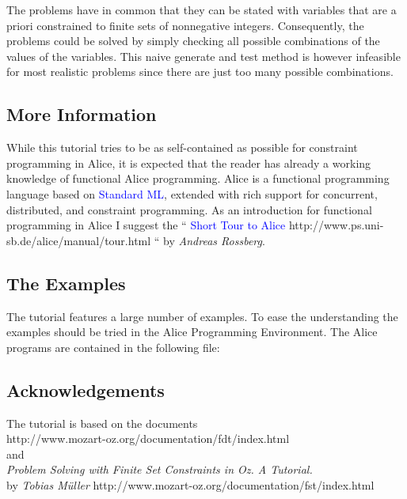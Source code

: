 \documentclass[a4paper]{scrartcl}
\begin{document}
The problems have in common that they can be stated with variables 
that are a priori 
constrained to finite sets of nonnegative integers. Consequently, 
the problems could be 
solved by simply checking all possible combinations of the values 
of the variables. This naive 
generate and test method is however infeasible for most realistic 
problems since there are just 
too many possible combinations.


\subsection{More Information}

While this tutorial tries to be as self-contained as possible for 
constraint programming in Alice, 
it is expected that the reader has already a working knowledge of
functional Alice programming. Alice is a functional programming
language based on \textcolor{blue}{Standard ML}, extended with rich
support for concurrent, distributed, and constraint programming.
As an introduction for functional programming in Alice I suggest the 
\cite{4} ``\htmladdnormallink
{\textcolor{blue}{Short Tour to Alice}}
{http://www.ps.uni-sb.de/alice/manual/tour.html}
`` by {\it Andreas Rossberg}.

\subsection{The Examples}

The tutorial features a large number of examples. To ease the 
understanding the examples should 
be tried in the Alice Programming Environment. The Alice 
programs are contained in the following 
file: 

\subsection{Acknowledgements}

The tutorial is based on the documents\\
{http://www.mozart-oz.org/documentation/fdt/index.html} 
\\ 
and\\
\htmladdnormallink
{\cite{2} {\it Problem Solving with 
Finite Set Constraints in Oz. A Tutorial.} \\
by {\it Tobias M\"uller}}
{http://www.mozart-oz.org/documentation/fst/index.html}
\end{document}
